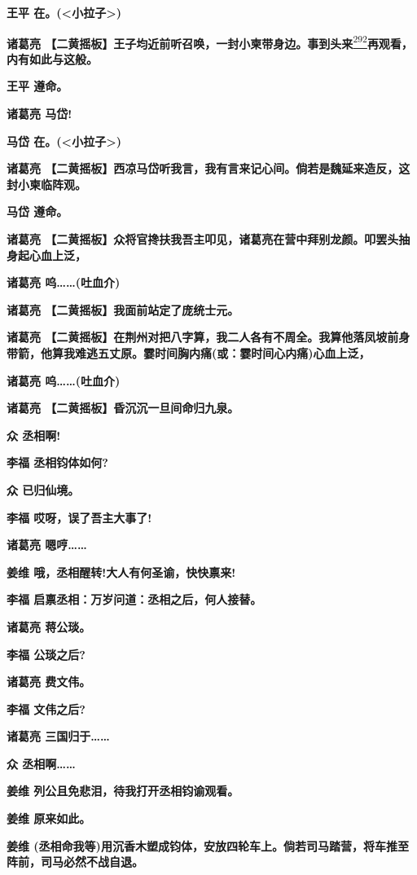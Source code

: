 \textbf{王平 在。(\textless{}小拉子\textgreater{})}

\textbf{诸葛亮
【二黄摇板】王子均近前听召唤，一封小柬带身边。事到头来}\protect\hyperlink{fn292}{\textsuperscript{292}}\textbf{再观看，内有如此与这般。}

\textbf{王平 遵命。}

\textbf{诸葛亮 马岱!}

\textbf{马岱 在。(\textless{}小拉子\textgreater{})}

\textbf{诸葛亮
【二黄摇板】西凉马岱听我言，我有言来记心间。倘若是魏延来造反，这封小柬临阵观。}

\textbf{马岱 遵命。}

\textbf{诸葛亮
【二黄摇板】众将官搀扶我吾主叩见，诸葛亮在营中拜别龙颜。叩罢头抽身起心血上泛，}

\textbf{诸葛亮 呜\ldots{}\ldots{}(吐血介)}

\textbf{诸葛亮 【二黄摇板】我面前站定了庞统士元。}

\textbf{诸葛亮
【二黄摇板】在荆州对把八字算，我二人各有不周全。我算他落凤坡前身带箭，他算我难逃五丈原。霎时间胸内痛(或：霎时间心内痛)心血上泛，}

\textbf{诸葛亮 呜\ldots{}\ldots{}(吐血介)}

\textbf{诸葛亮 【二黄摇板】昏沉沉一旦间命归九泉。}

\textbf{众 丞相啊!}

\textbf{李福 丞相钧体如何?}

\textbf{众 已归仙境。}

\textbf{李福 哎呀，误了吾主大事了!}

\textbf{诸葛亮 嗯哼\ldots{}\ldots{}}

\textbf{姜维 哦，丞相醒转!大人有何圣谕，快快禀来!}

\textbf{李福 启禀丞相：万岁问道：丞相之后，何人接替。}

\textbf{诸葛亮 蒋公琰。}

\textbf{李福 公琰之后?}

\textbf{诸葛亮 费文伟。}

\textbf{李福 文伟之后?}

\textbf{诸葛亮 三国归于\ldots{}\ldots{}}

\textbf{众 丞相啊\ldots{}\ldots{}}

\textbf{姜维 列公且免悲泪，待我打开丞相钧谕观看。}

\textbf{姜维 原来如此。}

\textbf{姜维
(丞相命我等)用沉香木塑成钧体，安放四轮车上。倘若司马踏营，将车推至阵前，司马必然不战自退。}


